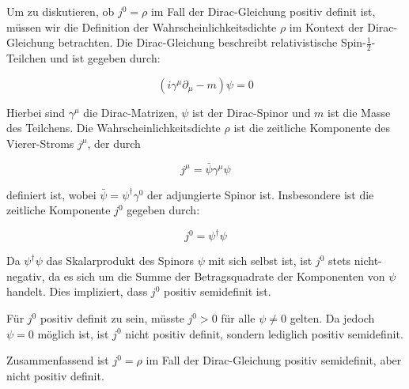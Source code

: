 Um zu diskutieren, ob $j^0 = \rho$ im Fall der Dirac-Gleichung positiv definit ist, müssen wir die Definition der Wahrscheinlichkeitsdichte $\rho$ im Kontext der Dirac-Gleichung betrachten. Die Dirac-Gleichung beschreibt relativistische Spin-$\frac{1}{2}$-Teilchen und ist gegeben durch:

\[
(i\gamma^\mu \partial_\mu - m)\psi = 0
\]

Hierbei sind $\gamma^\mu$ die Dirac-Matrizen, $\psi$ ist der Dirac-Spinor und $m$ ist die Masse des Teilchens. Die Wahrscheinlichkeitsdichte $\rho$ ist die zeitliche Komponente des Vierer-Stroms $j^\mu$, der durch

\[
j^\mu = \bar{\psi} \gamma^\mu \psi
\]

definiert ist, wobei $\bar{\psi} = \psi^\dagger \gamma^0$ der adjungierte Spinor ist. Insbesondere ist die zeitliche Komponente $j^0$ gegeben durch:

\[
j^0 = \psi^\dagger \psi
\]

Da $\psi^\dagger \psi$ das Skalarprodukt des Spinors $\psi$ mit sich selbst ist, ist $j^0$ stets nicht-negativ, da es sich um die Summe der Betragsquadrate der Komponenten von $\psi$ handelt. Dies impliziert, dass $j^0$ positiv semidefinit ist. 

Für $j^0$ positiv definit zu sein, müsste $j^0 > 0$ für alle $\psi \neq 0$ gelten. Da jedoch $\psi = 0$ möglich ist, ist $j^0$ nicht positiv definit, sondern lediglich positiv semidefinit. 

Zusammenfassend ist $j^0 = \rho$ im Fall der Dirac-Gleichung positiv semidefinit, aber nicht positiv definit.